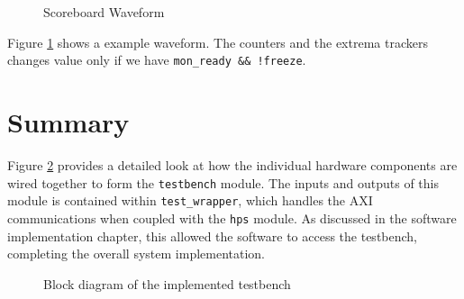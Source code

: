 \begin{figure}[H]
  \centering
  
  \caption{Scoreboard Waveform}
  \label{ScoreboardWave}
\end{figure}

Figure \ref{ScoreboardWave} shows a example waveform.
The counters and the extrema trackers changes value only if we have \texttt{mon\_ready \&\& !freeze}.

\section{Summary}

Figure \ref{DBlock} provides a detailed look at how the individual hardware components are wired together to form the \texttt{testbench} module.
The inputs and outputs of this module is contained within \texttt{test\_wrapper}, which handles the AXI communications when coupled with the \texttt{hps} module.
As discussed in the software implementation chapter, this allowed the software to access the testbench, completing the overall system implementation.

\begin{sidewaysfigure}
  \begin{figure}[H]
    \centering
    
    \caption{Block diagram of the implemented testbench}
    \label{DBlock}
  \end{figure}
\end{sidewaysfigure}

